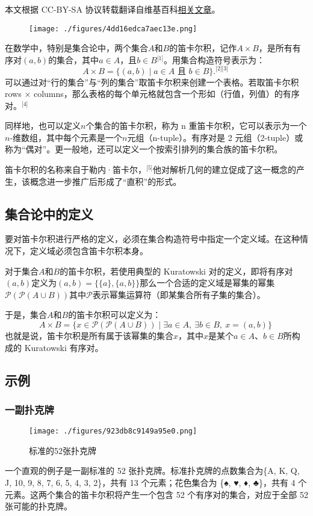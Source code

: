 
本文根据 CC-BY-SA 协议转载翻译自维基百科\href{https://en.wikipedia.org/wiki/Cartesian_product}{相关文章}。

\begin{figure}[ht]
\centering
\texttt{[image: ./figures/4dd16edca7aec13e.png]}
\caption{} \label{fig_DKR_4}
\end{figure}
在数学中，特别是集合论中，两个集合\(A\)和\(B\)的笛卡尔积，记作\( A \times B \)，是所有有序对\( (a, b) \)的集合，其中\( a \in A \)，且\( b \in B \)\(^\text{[1]}\)。用集合构造符号表示为：  
\[
A \times B = \{ (a, b) \mid a \in A \text{ 且 } b \in B \}.^\text{[2][3]}~
\]
可以通过对“行的集合”与“列的集合”取笛卡尔积来创建一个表格。若取笛卡尔积 rows × columns，那么表格的每个单元格就包含一个形如（行值，列值）的有序对。\(^\text{[4]}\)

同样地，也可以定义\(n\)个集合的笛卡尔积，称为 n 重笛卡尔积，它可以表示为一个\(n\)-维数组，其中每个元素是一个\(n\)元组（n-tuple）。有序对是 2 元组（2-tuple）或称为“偶对”。更一般地，还可以定义一个按索引排列的集合族的笛卡尔积。

笛卡尔积的名称来自于勒内·笛卡尔，\(^\text{[5]}\)他对解析几何的建立促成了这一概念的产生，该概念进一步推广后形成了“直积”的形式。
\subsection{集合论中的定义}
要对笛卡尔积进行严格的定义，必须在集合构造符号中指定一个定义域。在这种情况下，定义域必须包含笛卡尔积本身。

对于集合\( A \)和\( B \)的笛卡尔积，若使用典型的 Kuratowski 对的定义，即将有序对\( (a, b) \)定义为\((a, b) = \{\{a\}, \{a, b\}\}\)那么一个合适的定义域是幂集的幂集\(\mathcal{P}(\mathcal{P}(A \cup B))\)其中\( \mathcal{P} \)表示幂集运算符（即某集合所有子集的集合）。

于是，集合\( A \)和\( B \)的笛卡尔积可以定义为：  
\[
A \times B = \{ x \in \mathcal{P}(\mathcal{P}(A \cup B)) \mid \exists a \in A,\ \exists b \in B,\ x = (a, b) \}~
\]  
也就是说，笛卡尔积是所有属于该幂集的集合\( x \)，其中\( x \)是某个\( a \in A \)、\( b \in B \)所构成的 Kuratowski 有序对。
\subsection{示例}  
\subsubsection{一副扑克牌}
\begin{figure}[ht]
\centering
\texttt{[image: ./figures/923db8c9149a95e0.png]}
\caption{标准的52张扑克牌} \label{fig_DKR_1}
\end{figure}
一个直观的例子是一副标准的 52 张扑克牌。标准扑克牌的点数集合为\{A, K, Q, J, 10, 9, 8, 7, 6, 5, 4, 3, 2\}，共有 13 个元素；花色集合为 \{♠, ♥, ♦, ♣\}，共有 4 个元素。这两个集合的笛卡尔积将产生一个包含 52 个有序对的集合，对应于全部 52 张可能的扑克牌。

